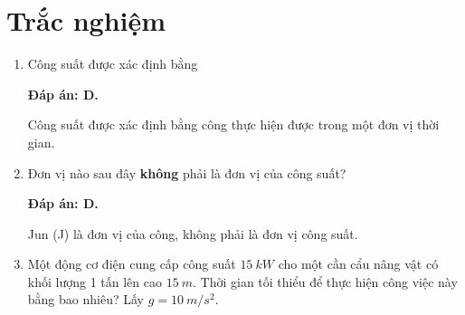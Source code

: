 \let\lesson\undefined
\newcommand{\lesson}{\phantomlesson{Bài 16.}}
\setcounter{section}{2}
\section{Trắc nghiệm}
\begin{enumerate}[label=\bfseries Câu \arabic*:, leftmargin=1.5cm]
	
	\item {}
	
	
	{
		Công suất được xác định bằng
	}
	
	\hideall
	{	
		\textbf{Đáp án: D.}
		
		Công suất được xác định bằng công thực hiện được trong một đơn vị thời gian.
	}
	\item {}
	
	
	{
		Đơn vị nào sau đây \textbf{không} phải là đơn vị của công suất?
	}
	
	\hideall
	{	
		\textbf{Đáp án: D.}
		
		Jun (J) là đơn vị của công, không phải là đơn vị công suất.
	}
	\item {}
	
	
	{
		Một động cơ điện cung cấp công suất $\SI{15}{kW}$ cho một cần cẩu nâng vật có khối lượng 1 tấn lên cao $\SI{15}{m}$. Thời gian tối thiểu để thực hiện công việc này bằng bao nhiêu? Lấy $g=\SI{10}{m/s^2}$.
	}
	

\end{enumerate}
